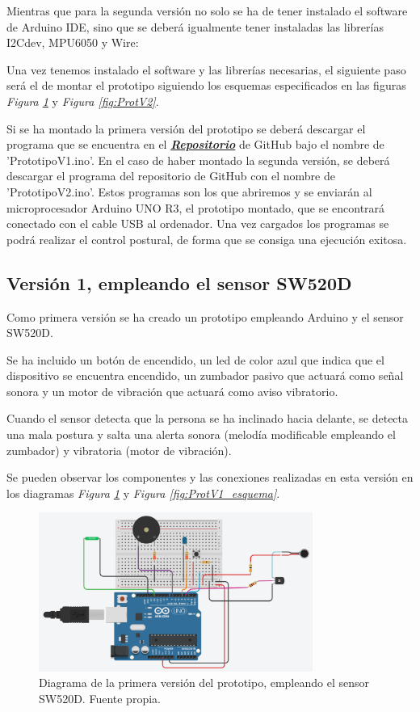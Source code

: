 Mientras que para la segunda versión no solo se ha de tener instalado el software de Arduino IDE, sino que se deberá igualmente tener instaladas las librerías I2Cdev\cite{LibI2Cdev}, MPU6050\cite{LibMPU6050} y Wire\cite{LibWire}: 

Una vez tenemos instalado el software y las librerías necesarias, el siguiente paso será el de montar el prototipo siguiendo los esquemas especificados en las figuras \textit{Figura \ref{fig:ProtV1}} y \textit{Figura \ref{fig:ProtV2}}.


Si se ha montado la primera versión del prototipo se deberá descargar el programa que se encuentra en el \href{https://github.com/NaiaraGadea/TFG_DispositivoDeControlPostural}{\textbf{\textit{Repositorio}}} de GitHub\cite{GitHub} bajo el nombre de 'PrototipoV1.ino'. En el caso de haber montado la segunda versión, se deberá descargar el programa del repositorio de GitHub\cite{GitHub} con el nombre de 'PrototipoV2.ino'. Estos programas son los que abriremos y se enviarán al microprocesador Arduino UNO R3\cite{Arduino2}, el prototipo montado, que se encontrará conectado con el cable USB al ordenador. Una vez cargados los programas se podrá realizar el control postural, de forma que se consiga una ejecución exitosa.


\subsection{Versión 1, empleando el sensor SW520D}
Como primera versión se ha creado un prototipo empleando Arduino\cite{Arduino1} y el sensor SW520D\cite{SW520D_1}.

Se ha incluido un botón de encendido, un led de color azul que indica que el dispositivo se encuentra encendido, un zumbador pasivo que actuará como señal sonora y un motor de vibración que actuará como aviso vibratorio.

Cuando el sensor detecta que la persona se ha inclinado hacia delante, se detecta una mala postura y salta una alerta sonora (melodía modificable empleando el zumbador) y vibratoria (motor de vibración).

Se pueden observar los componentes y las conexiones realizadas en esta versión en los diagramas \textit{Figura \ref{fig:ProtV1}} y \textit{Figura \ref{fig:ProtV1_esquema}}. 

\begin{figure}[h!]
    \centering
    \includegraphics[width=0.8\textwidth]{img/PrototipoV1_Tilt.png}
    \caption{Diagrama de la primera versión del prototipo, empleando el sensor SW520D. Fuente propia.}
    \label{fig:ProtV1}
\end{figure}

